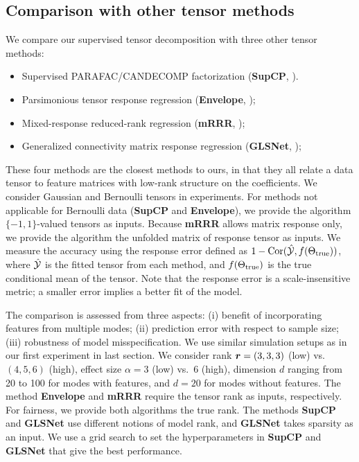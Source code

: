 \documentclass[12pt]{article}
\theoremstyle{definition}
\theoremstyle{definition}
\begin{document}
\subsection{Comparison with other tensor methods}
We compare our supervised tensor decomposition with three other tensor methods:

{\color{blue}\begin{itemize}[noitemsep,topsep=0pt]
\item Supervised PARAFAC/CANDECOMP factorization (\textbf{SupCP}, \citep{lock2018supervised}).
    \item Parsimonious tensor response regression (\textbf{Envelope}, \citep{li2017parsimonious});
    \item Mixed-response reduced-rank regression (\textbf{mRRR}, \citep{luo2018leveraging});
    \item Generalized connectivity matrix response regression (\textbf{GLSNet}, \citep{zhang2018network});
\end{itemize}
}

{\color{blue}These four methods are the closest methods to ours, in that they all relate a data tensor to feature matrices with low-rank structure on the coefficients.} We consider Gaussian and Bernoulli tensors in experiments. For methods not applicable for Bernoulli data ({\bf SupCP} and {\bf Envelope}), we provide the algorithm $\{-1,1\}$-valued tensors as inputs. Because {\bf mRRR} allows matrix response only, we provide the algorithm the unfolded matrix of response tensor as inputs. We measure the accuracy using the response error defined as $1-\text{Cor}(\hat {\mathcal{Y}}, f(\Theta_{\textup{true}}))$, where $\hat {\mathcal{Y}}$ is the fitted tensor from each method, and $f(\Theta_{\textup{true}})$ is the true conditional mean of the tensor. Note that the response error is a scale-insensitive metric; a smaller error implies a better fit of the model.


{\color{blue}The comparison is assessed from three aspects: (i) benefit of incorporating features from multiple modes; (ii) prediction error with respect to sample size; (iii) robustness of model misspecification.} We use similar simulation setups as in our first experiment in last section. We consider rank $\bm{r}=(3,3,3)$ (low) vs.\ $(4,5,6)$ (high), effect size $\alpha = 3$ (low) vs.\ $6$ (high), dimension $d$ ranging from 20 to 100 for modes with features, and $d = 20$ for modes without features. The method \textbf{Envelope} and \textbf{mRRR} require the tensor rank as inputs, respectively. For fairness, we provide both algorithms the true rank. The methods \textbf{SupCP} and \textbf{GLSNet} use different notions of model rank, and \textbf{GLSNet} takes sparsity as an input. We use a grid search to set the hyperparameters in \textbf{SupCP} and \textbf{GLSNet} that give the best performance.
\end{document}
